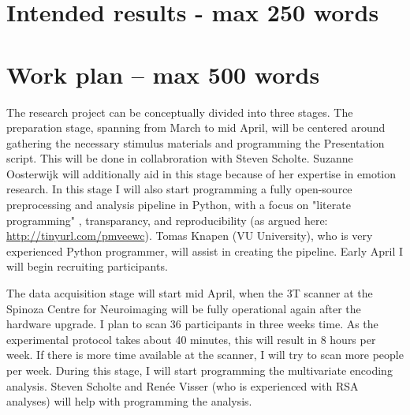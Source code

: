 \documentclass[12pt,a4paper]{article}\usepackage[]{graphicx}\usepackage[]{color}
\begin{document}
\noindent
\wordcount

\section{Intended results \textmd{- max 250 words}}





\noindent
\wordcount

\section{Work plan \textmd{– max 500 words}}
The research project can be conceptually divided into three stages. The preparation stage, spanning from March to mid April, will be centered around gathering the necessary stimulus materials and programming the Presentation script. This will be done in collabroration with Steven Scholte. Suzanne Oosterwijk will additionally aid in this stage because of her expertise in emotion research. In this stage I will also start programming a fully open-source preprocessing and analysis pipeline in Python, with a focus on "literate programming" \citep{knuth1984}, transparancy, and reproducibility (as argued here: \url{http://tinyurl.com/pmveewc}). Tomas Knapen (VU University), who is very experienced Python programmer, will assist in creating the pipeline. Early April I will begin recruiting participants. 

The data acquisition stage will start mid April, when the 3T scanner at the Spinoza Centre for Neuroimaging will be fully operational again after the hardware upgrade. I plan to scan 36 participants in three weeks time. As the experimental protocol takes about 40 minutes, this will result in 8 hours per week. If there is more time available at the scanner, I will try to scan more people per week. During this stage, I will start programming the multivariate encoding analysis. Steven Scholte and Renée Visser (who is experienced with RSA analyses) will help with programming the analysis.
\end{document}

